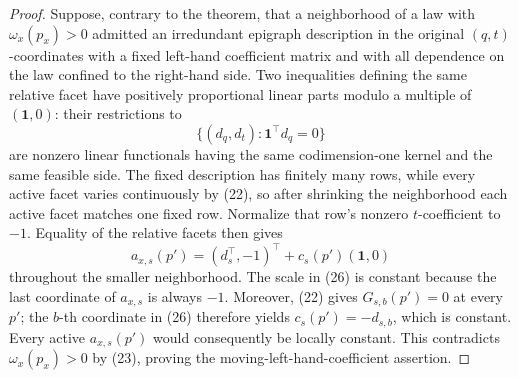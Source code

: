 \documentclass{article}
\begin{document}
\begin{proof}
Suppose, contrary to the theorem, that a neighborhood of a law with \(\omega_x(p_x)>0\) admitted an irredundant epigraph description in the original \((q,t)\)-coordinates with a fixed left-hand coefficient matrix and with all dependence on the law confined to the right-hand side.  Two inequalities defining the same relative facet have positively proportional linear parts modulo a multiple of \((\mathbf 1,0)\): their restrictions to
\[
 \{(d_q,d_t):\mathbf 1^\top d_q=0\}
\]
are nonzero linear functionals having the same codimension-one kernel and the same feasible side.  The fixed description has finitely many rows, while every active facet varies continuously by (22), so after shrinking the neighborhood each active facet matches one fixed row.  Normalize that row's nonzero \(t\)-coefficient to \(-1\).  Equality of the relative facets then gives
\[
 a_{x,s}(p')=(d_s^\top,-1)^\top+c_s(p')(\mathbf 1,0)
 \tag{26}
\]
throughout the smaller neighborhood.  The scale in (26) is constant because the last coordinate of \(a_{x,s}\) is always \(-1\).  Moreover, (22) gives \(G_{s,b}(p')=0\) at every \(p'\); the \(b\)-th coordinate in (26) therefore yields \(c_s(p')=-d_{s,b}\), which is constant.  Every active \(a_{x,s}(p')\) would consequently be locally constant.  This contradicts \(\omega_x(p_x)>0\) by (23), proving the moving-left-hand-coefficient assertion.


\end{proof}
\end{document}
